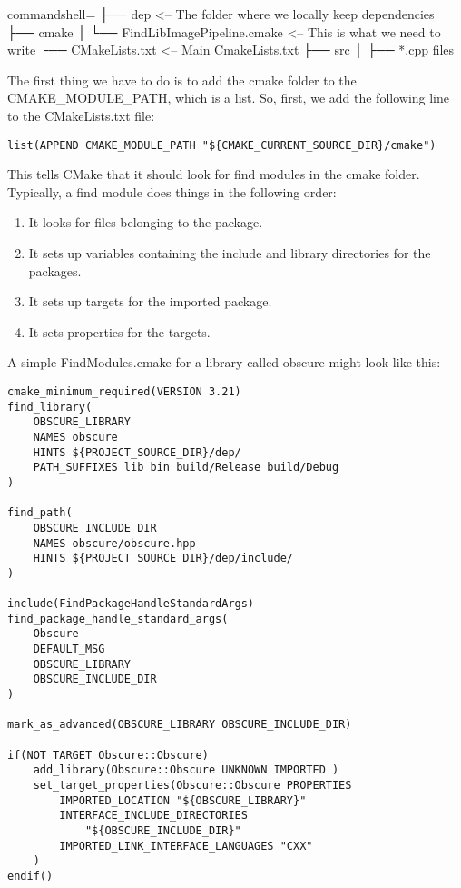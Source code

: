 \begin{tcblisting}{commandshell={}}
├── dep <-- The folder where we locally keep dependencies
├── cmake
│       └── FindLibImagePipeline.cmake <-- This is what we need to write
├── CMakeLists.txt <-- Main CmakeLists.txt
├── src
│       ├── *.cpp files
\end{tcblisting}

The first thing we have to do is to add the cmake folder to the CMAKE\_MODULE\_PATH, which is a list. So, first, we add the following line to the CMakeLists.txt file:

\begin{lstlisting}[style=styleCMake]
list(APPEND CMAKE_MODULE_PATH "${CMAKE_CURRENT_SOURCE_DIR}/cmake")
\end{lstlisting}

This tells CMake that it should look for find modules in the cmake folder. Typically, a find module does things in the following order:

\begin{enumerate}
\item 
It looks for files belonging to the package.
	
\item 
It sets up variables containing the include and library directories for the packages.

\item 
It sets up targets for the imported package.

\item 
It sets properties for the targets.
\end{enumerate}

A simple FindModules.cmake for a library called obscure might look like this:

\begin{lstlisting}[style=styleCMake]
cmake_minimum_required(VERSION 3.21)
find_library(
	OBSCURE_LIBRARY
	NAMES obscure
	HINTS ${PROJECT_SOURCE_DIR}/dep/
	PATH_SUFFIXES lib bin build/Release build/Debug
)

find_path(
	OBSCURE_INCLUDE_DIR
	NAMES obscure/obscure.hpp
	HINTS ${PROJECT_SOURCE_DIR}/dep/include/
)

include(FindPackageHandleStandardArgs)
find_package_handle_standard_args(
	Obscure
	DEFAULT_MSG
	OBSCURE_LIBRARY
	OBSCURE_INCLUDE_DIR
)

mark_as_advanced(OBSCURE_LIBRARY OBSCURE_INCLUDE_DIR)

if(NOT TARGET Obscure::Obscure)
	add_library(Obscure::Obscure UNKNOWN IMPORTED )
	set_target_properties(Obscure::Obscure PROPERTIES
		IMPORTED_LOCATION "${OBSCURE_LIBRARY}"
		INTERFACE_INCLUDE_DIRECTORIES
			"${OBSCURE_INCLUDE_DIR}"
		IMPORTED_LINK_INTERFACE_LANGUAGES "CXX"
	)
endif()
\end{lstlisting}

